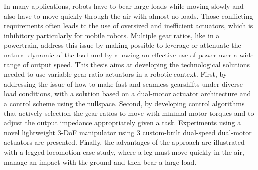 In many applications, robots have to bear large loads while moving slowly and also have to move quickly through the air with almost no loads. Those conflicting requirements often leads to the use of oversized and inefficient actuators, which is inhibitory particularly for mobile robots. Multiple gear ratios, like in a powertrain, address this issue by making possible to leverage or attenuate the natural dynamic of the load and by allowing an effective use of power over a wide range of output speed. This thesis aims at developing the technological solutions needed to use variable gear-ratio actuators in a robotic context. First, by addressing the issue of how to make fast and seamless gearshifts under diverse load conditions, with a solution based on a dual-motor actuator architecture and a control scheme using the nullspace. Second, by developing control algorithms that actively selection the gear-ratios to move with minimal motor torques and to adjust the output impedance appropriately given a task. Experiments using a novel lightweight 3-DoF manipulator using 3 custom-built dual-speed dual-motor actuators are presented. Finally, the advantages of the approach are illustrated with a legged locomotion case-study, where a leg must move quickly in the air, manage an impact with the ground and then bear a large load.
